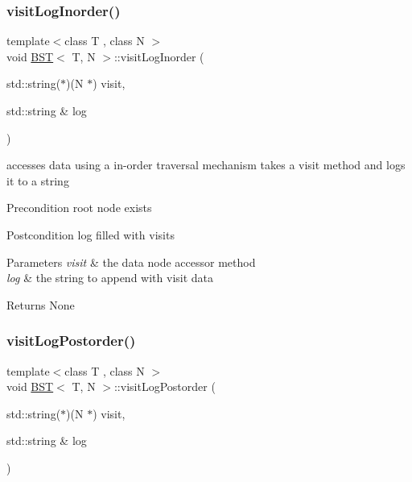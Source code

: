 \subsubsection{\texorpdfstring{visit\+Log\+Inorder()}{visitLogInorder()}}
{\footnotesize\ttfamily template$<$class T , class N $>$ \\
void \hyperlink{class_b_s_t}{B\+ST}$<$ T, N $>$\+::visit\+Log\+Inorder (\begin{DoxyParamCaption}\item[{std\+::string($\ast$)(N $\ast$)}]{visit,  }\item[{std\+::string \&}]{log }\end{DoxyParamCaption})}

accesses data using a in-\/order traversal mechanism takes a visit method and logs it to a string \begin{DoxyPrecond}{Precondition}
root node exists 
\end{DoxyPrecond}
\begin{DoxyPostcond}{Postcondition}
log filled with visits 
\end{DoxyPostcond}

\begin{DoxyParams}{Parameters}
{\em visit} & the data node accessor method \\
\hline
{\em log} & the string to append with visit data \\
\hline
\end{DoxyParams}
\begin{DoxyReturn}{Returns}
None 
\end{DoxyReturn}
\mbox{\label{class_b_s_t_a831b6fdcda13b7a353e03992b9c965b7}} 
\subsubsection{\texorpdfstring{visit\+Log\+Postorder()}{visitLogPostorder()}}
{\footnotesize\ttfamily template$<$class T , class N $>$ \\
void \hyperlink{class_b_s_t}{B\+ST}$<$ T, N $>$\+::visit\+Log\+Postorder (\begin{DoxyParamCaption}\item[{std\+::string($\ast$)(N $\ast$)}]{visit,  }\item[{std\+::string \&}]{log }\end{DoxyParamCaption})}

